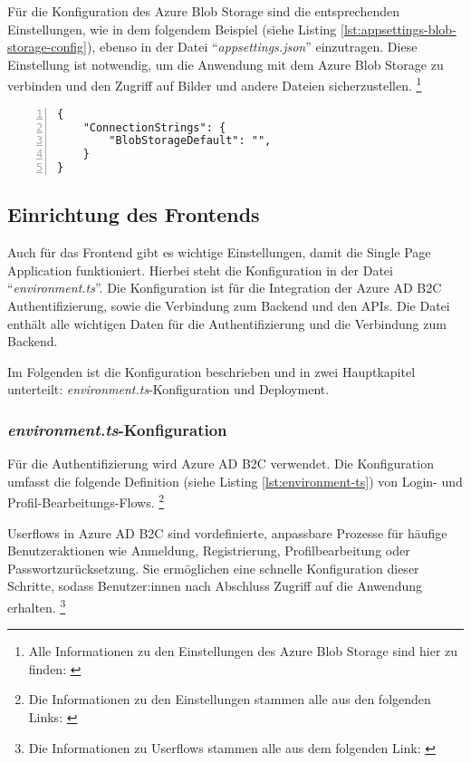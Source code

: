 Für die Konfiguration des Azure Blob Storage sind die entsprechenden Einstellungen, wie in 
dem folgendem Beispiel (siehe Listing \ref{lst:appsettings-blob-storage-config}), ebenso in der Datei 
``\emph{appsettings.json}'' einzutragen. Diese Einstellung ist notwendig, um die 
Anwendung mit dem Azure Blob Storage zu verbinden und den Zugriff auf Bilder und 
andere Dateien sicherzustellen.
\footnote{Alle Informationen zu den Einstellungen des Azure Blob Storage sind hier zu finden: \cite{MicrosoftCorporationm}}

\begin{lstlisting}[numbers=left,caption={appsettings.json},label={lst:appsettings-blob-storage-config}]
{
    "ConnectionStrings": {
        "BlobStorageDefault": "",
    }
}
\end{lstlisting}


\subsection{Einrichtung des Frontends}

Auch für das Frontend gibt es wichtige Einstellungen, damit die Single Page Application
funktioniert. Hierbei steht die Konfiguration in der Datei ``\emph{environment.ts}''.
Die Konfiguration ist für die Integration der Azure AD B2C Authentifizierung, sowie die 
Verbindung zum Backend und den APIs. Die Datei enthält alle wichtigen Daten für 
die Authentifizierung und die Verbindung zum Backend. 

Im Folgenden ist die Konfiguration beschrieben und in zwei Hauptkapitel unterteilt: 
\emph{environment.ts}-Konfiguration und Deployment.


\subsubsection{\emph{environment.ts}-Konfiguration}

Für die Authentifizierung wird Azure AD B2C verwendet. Die Konfiguration umfasst 
die folgende Definition (siehe Listing \ref{lst:environment-ts}) von Login- und Profil-Bearbeitungs-Flows.
\footnote{Die Informationen zu den Einstellungen stammen alle aus den folgenden Links: \cite{MicrosoftCorporationh} \cite{MicrosoftCorporationg}}

Userflows in Azure AD B2C sind vordefinierte, anpassbare Prozesse für häufige Benutzeraktionen 
wie Anmeldung, Registrierung, Profilbearbeitung oder Passwortzurücksetzung. Sie ermöglichen 
eine schnelle Konfiguration dieser Schritte, sodass Benutzer:innen nach Abschluss Zugriff auf 
die Anwendung erhalten.
\footnote{Die Informationen zu Userflows stammen alle aus dem folgenden Link: \cite{MicrosoftCorporationn}}

